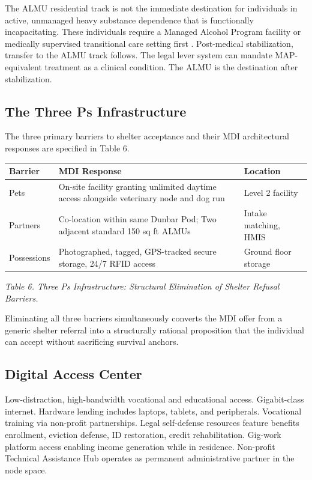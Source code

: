 \documentclass[12pt, letterpaper]{article}
\begin{document}
The ALMU residential track is not the immediate destination for individuals in active, unmanaged heavy substance dependence that is functionally incapacitating. These individuals require a Managed Alcohol Program facility or medically supervised transitional care setting first \citep{ottawa_map_2006, seattle_1811_eastlake_2009}. Post-medical stabilization, transfer to the ALMU track follows. The legal lever system can mandate MAP-equivalent treatment as a clinical condition. The ALMU is the destination after stabilization.

\subsection{The Three Ps Infrastructure}

The three primary barriers to shelter acceptance and their MDI architectural responses are specified in Table 6.

{\singlespacing
\begin{tabularx}{\textwidth}{@{}lXl@{}}
\toprule
\rowcolor{rowgray}
Barrier & MDI Response & Location \\
\midrule
Pets & On-site facility granting unlimited daytime access alongside veterinary node and dog run & Level 2 facility \\
\rowcolor{rowgray}
Partners & Co-location within same Dunbar Pod; Two adjacent standard 150 sq ft ALMUs & Intake matching, HMIS \\
Possessions & Photographed, tagged, GPS-tracked secure storage, 24/7 RFID access & Ground floor storage \\
\bottomrule
\end{tabularx}\par
\vspace{8pt}
\noindent\textit{Table 6. Three Ps Infrastructure: Structural Elimination of Shelter Refusal Barriers.}
\par}
Eliminating all three barriers simultaneously converts the MDI offer from a generic shelter referral into a structurally rational proposition that the individual can accept without sacrificing survival anchors.

\subsection{Digital Access Center}

Low-distraction, high-bandwidth vocational and educational access. Gigabit-class internet. Hardware lending includes laptops, tablets, and peripherals. Vocational training via non-profit partnerships. Legal self-defense resources feature benefits enrollment, eviction defense, ID restoration, credit rehabilitation. Gig-work platform access enabling income generation while in residence. Non-profit Technical Assistance Hub operates as permanent administrative partner in the node space.
\end{document}
